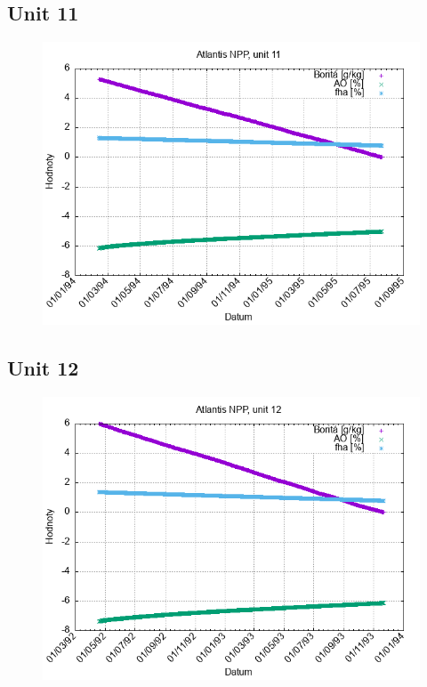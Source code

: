 \documentclass{article}
\begin{document}
\subsection*{Unit 11}
\begin{figure}[h!]
\centering
\includegraphics[width=14cm]{./grafy/Atlantis11.png}
\end{figure}
\clearpage
\subsection*{Unit 12}
\begin{figure}[h!]
\centering
\includegraphics[width=14cm]{./grafy/Atlantis12.png}
\end{figure}
\clearpage
\end{document}
